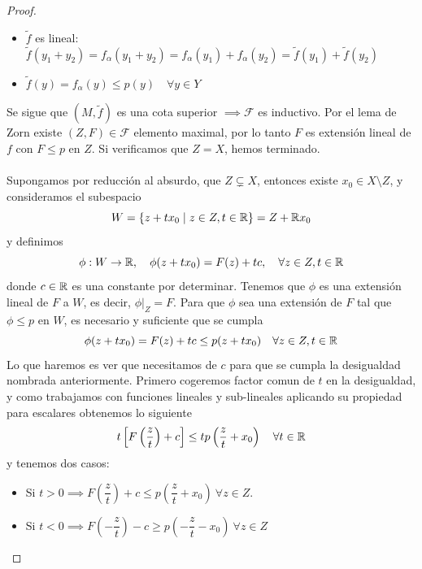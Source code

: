 \begin{teo}
\begin{proof}
\begin{itemize}
        \item[iii)] $\tilde{f}$ es lineal: $\tilde{f}(y_1 + y_2) = f_\alpha(y_1 + y_2) = f_\alpha(y_1) + f_\alpha(y_2) = \tilde{f}(y_1) + \tilde{f}(y_2)$
        \item[iv)] $\tilde{f}(y) = f_\alpha(y) \leq p(y) \quad \forall y \in Y$
    \end{itemize}
    Se sigue que $(M, \tilde{f})$ es una cota superior $\implies \mathcal{F}$ es inductivo. Por el lema de Zorn existe $(Z, F) \in \mathcal{F}$ elemento maximal, por lo tanto $F$ es extensión lineal de $f$ con $F \leq p$ en $Z$. Si verificamos que $Z = X$, hemos terminado. \\ \\
    \noindent
    Supongamos por reducción al absurdo, que $Z \subsetneq X$, entonces existe $x_0 \in X \setminus Z$, y consideramos el subespacio
    \begin{equation*}
        W = \{ z + t x_0 \mid z \in Z, t \in \mathbb{R} \}=Z+\mathbb{R} x_0
    \end{equation*}
    y definimos
    \begin{equation*}
        \phi:W \to \mathbb{R}, \quad \phi(z+tx_0) = F(z) + t c, \quad \forall z \in Z, t \in \mathbb{R}
    \end{equation*}
    donde $c\in \mathbb{R}$ es una constante por determinar. Tenemos que $\phi$ es una extensión lineal de $F$ a $W$, es decir, $\phi|_Z = F$. Para que $\phi$ sea una extensión de $F$ tal que $\phi \leq p$ en $W$, es necesario y suficiente que se cumpla
    \begin{equation} \label{eq:demo-banach}
        \phi(z+tx_0) = F(z) + t c \leq p(z + t x_0) \quad \forall z \in Z, t \in \mathbb{R}
    \end{equation}
    Lo que haremos es ver que necesitamos de $c$ para que se cumpla la desigualdad nombrada anteriormente. Primero cogeremos factor comun de $t$ en la desigualdad, y como trabajamos con funciones lineales y sub-lineales aplicando su propiedad para escalares obtenemos lo siguiente
    \begin{equation*}
        t\left[ F\left(\dfrac{z}{t}\right)+c\right] \leq t p\left(\dfrac{z}{t}+ x_0\right) \quad \forall t \in \mathbb{R}
    \end{equation*}
    y tenemos dos casos:
    \begin{itemize}
        \item Si $t > 0 \implies F\left(\dfrac{z}{t}\right)+c \leq p\left(\dfrac{z}{t}+ x_0\right) \ \forall z \in Z$.
        \item Si $t < 0 \implies F\left(-\dfrac{z}{t}\right)-c \geq p\left(-\dfrac{z}{t}- x_0\right) \ \forall z \in Z$

\end{itemize}
\end{proof}
\end{teo}
